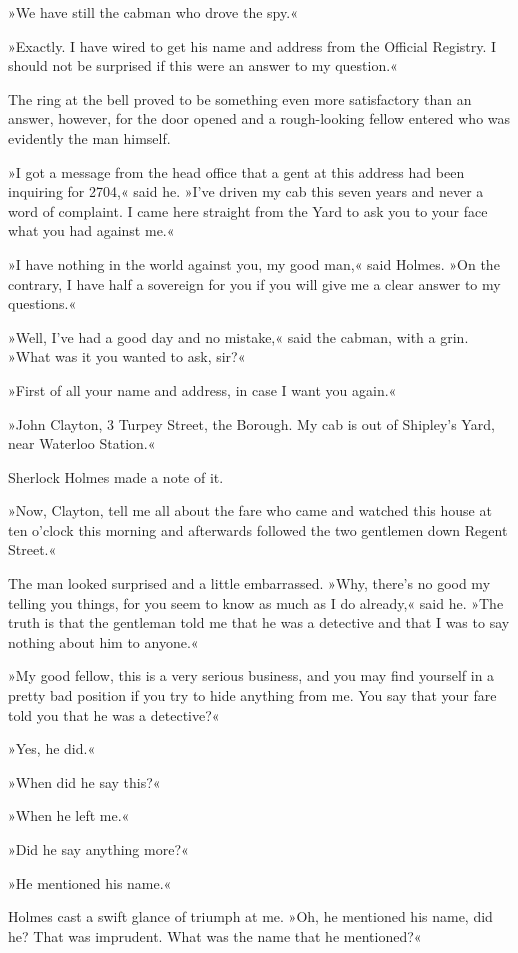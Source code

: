 »We have still the cabman who drove the spy.«

»Exactly. I have wired to get his name and address from the Official Registry. I should not be surprised if this were an answer to my question.«

The ring at the bell proved to be something even more satisfactory than an answer, however, for the door opened and a rough-looking fellow entered who was evidently the man himself.

»I got a message from the head office that a gent at this address had been inquiring for 2704,« said he. »I've driven my cab this seven years and never a word of complaint. I came here straight from the Yard to ask you to your face what you had against me.«

»I have nothing in the world against you, my good man,« said Holmes. »On the contrary, I have half a sovereign for you if you will give me a clear answer to my questions.«

»Well, I've had a good day and no mistake,« said the cabman, with a grin. »What was it you wanted to ask, sir?«

»First of all your name and address, in case I want you again.«

»John Clayton, 3 Turpey Street, the Borough. My cab is out of Shipley's Yard, near Waterloo Station.«

Sherlock Holmes made a note of it.

»Now, Clayton, tell me all about the fare who came and watched this house at ten o'clock this morning and afterwards followed the two gentlemen down Regent Street.«

The man looked surprised and a little embarrassed. »Why, there's no good my telling you things, for you seem to know as much as I do already,« said he. »The truth is that the gentleman told me that he was a detective and that I was to say nothing about him to anyone.«

»My good fellow, this is a very serious business, and you may find yourself in a pretty bad position if you try to hide anything from me. You say that your fare told you that he was a detective?«

»Yes, he did.«

»When did he say this?«

»When he left me.«

»Did he say anything more?«

»He mentioned his name.«


Holmes cast a swift glance of triumph at me. »Oh, he mentioned his name, did he? That was imprudent. What was the name that he mentioned?«

